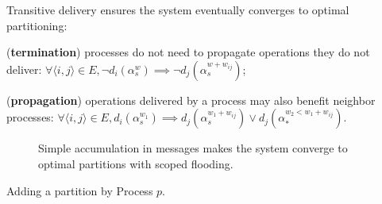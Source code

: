 \begin{definition}
  Transitive delivery ensures the system eventually converges to
  optimal partitioning:
  \begin{inparaenum}[(i)]
  \item (\textbf{termination}) processes do not need to propagate
    operations they do not deliver: $\forall \langle i, j \rangle \in
    E, \neg d_i(\alpha_{s}^w)\implies \neg
    d_j(\alpha_{s}^{w+w_{ij}})$;
  \item (\textbf{propagation}) operations delivered by a process may
    also benefit neighbor processes: $\forall \langle i, j \rangle \in
    E, d_i(\alpha_{s}^{w_1}) \implies
    d_j(\alpha_{s}^{w_1+w_{ij}}) \vee
    d_j(\alpha_{*}^{w_2 < w_1 + w_{ij}})$.
  \end{inparaenum}
\end{definition}


\begin{figure*}
  \begin{center}
    \subfloat[Part A][\label{fig:addA}Both Process $a$ and
      Process $c$ initiate a partition.
      $w_{ab} = 1.5$; $w_{bc} = w_{cd} = w_{bd} = 1$.]{}
    \hspace{5pt}
    \hspace{5pt}
    \hspace{5pt}
    \caption{\label{fig:add}Simple accumulation in messages makes the
      system converge to optimal partitions with scoped flooding.}
  \end{center}
\end{figure*}

\begin{algorithm}
  
  \caption{\label{algo:add}Adding a partition by Process $p$.}
\end{algorithm}


